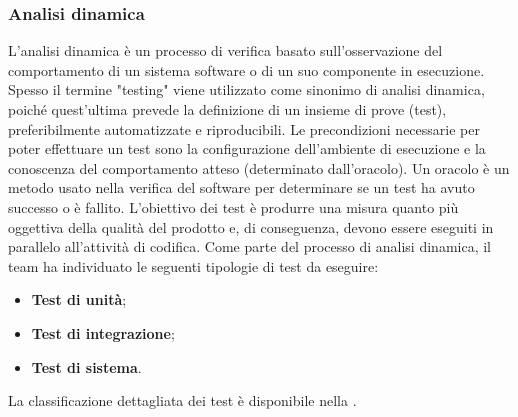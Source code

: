 \subsubsection{Analisi dinamica}
\par L’analisi dinamica è un processo di verifica basato sull’osservazione del comportamento di un sistema software o di un suo componente in esecuzione. Spesso il termine "testing" viene utilizzato come sinonimo di analisi dinamica, poiché quest’ultima prevede la definizione di un insieme di prove (test), preferibilmente automatizzate e riproducibili. Le precondizioni necessarie per poter effettuare un test sono la configurazione dell'ambiente di esecuzione e la conoscenza del comportamento atteso (determinato dall'oracolo). Un oracolo è un metodo usato nella verifica del software per determinare se un test ha avuto successo o è fallito. L’obiettivo dei test è produrre una misura quanto più oggettiva della qualità del prodotto e, di conseguenza, devono essere eseguiti in parallelo all'attività di codifica. Come parte del processo di analisi dinamica, il team ha individuato le seguenti tipologie di test da eseguire:
\begin{itemize}
  \item \textbf{Test di unità};
  \item \textbf{Test di integrazione};
  \item \textbf{Test di sistema}.
\end{itemize}

\vspace{0.5\baselineskip}
\par La classificazione dettagliata dei test è disponibile nella .
